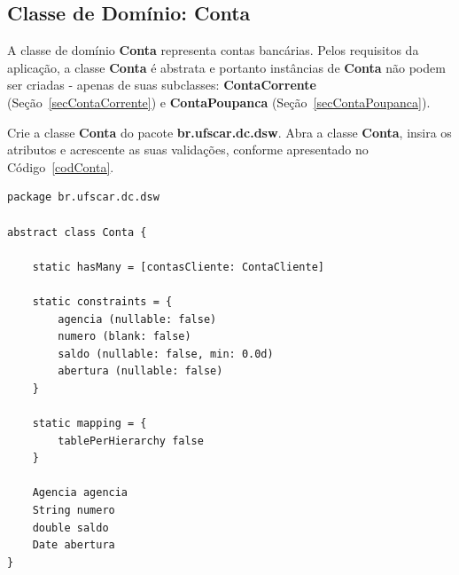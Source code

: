 \newpage

\subsection{Classe de Domínio: Conta}\label{secConta}

\vspace{0.5cm}

A classe de domínio {\bf Conta} representa contas bancárias. Pelos requisitos da
aplicação, a classe {\bf Conta} é  abstrata e portanto instâncias de {\bf Conta}
não  podem  ser  criadas  -  apenas  de  suas  subclasses:  {\bf  ContaCorrente}
(Seção~\ref{secContaCorrente})           e          {\bf          ContaPoupanca}
(Seção~\ref{secContaPoupanca}). 

Crie a classe {\bf Conta} do  pacote {\bf br.ufscar.dc.dsw}.  Abra a classe {\bf
  Conta},  insira  os  atributos  e  acrescente  as  suas  validações,  conforme
apresentado no Código~\ref{codConta}.  

\begin{lstlisting}[caption=Classe  de   domínio  {\bf  Conta},   frame  =  trBL,
    float=htbp, label=codConta] 
package br.ufscar.dc.dsw

abstract class Conta {

    static hasMany = [contasCliente: ContaCliente]
    
    static constraints = {
        agencia (nullable: false)
        numero (blank: false)
        saldo (nullable: false, min: 0.0d)
        abertura (nullable: false)
    }
	
    static mapping = {
        tablePerHierarchy false
    }
        
    Agencia agencia
    String numero
    double saldo
    Date abertura
}
\end{lstlisting}

\hspace{1cm}\\
\hspace{1cm}\\

